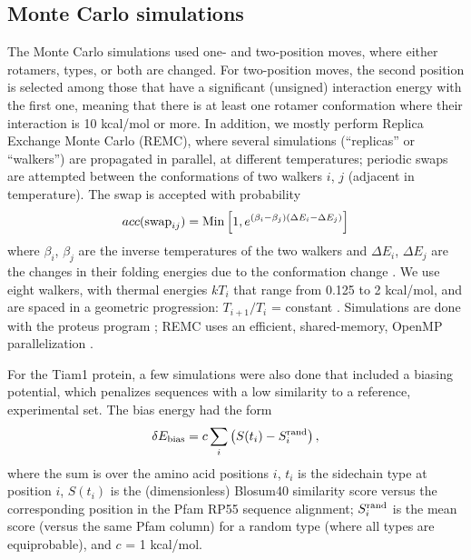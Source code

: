\documentclass[12pt]{article}
\begin{document}
\subsection{Monte Carlo simulations}
The Monte Carlo simulations used one- and two-position moves, where either rotamers, types, or both are changed. For two-position
moves, the second position is selected among those that have a significant (unsigned) interaction energy with the first one,
meaning that there is at least one rotamer conformation where their interaction is 10 kcal/mol or more. In addition, we mostly
perform Replica Exchange Monte Carlo (REMC), where several simulations (``replicas'' or ``walkers'') are propagated in parallel,
at different temperatures; periodic swaps are attempted between the conformations of two walkers $i$, $j$ (adjacent in temperature).
The swap is accepted with probability
\begin{equation} \label{eq:remc}
acc({\rm swap}_{ij}) = {\rm Min} \left[ 1, e^{(\beta_i - \beta_j)(\Delta E_i - \Delta E_j)} \right]
\end{equation}
where $\beta_i$, $\beta_j$ are the inverse temperatures of the two walkers and $\Delta E_i$, $\Delta E_j$ are the changes in
their folding energies due to the conformation change \cite{Kofke02,Earl05}. We use eight walkers, with thermal energies $kT_i$
that range from 0.125 to 2 kcal/mol, and are spaced in a geometric progression: $T_{i+1}/T_i$ = constant \cite{Kofke02}.
Simulations are done with the proteus program \cite{Simonson13b}; REMC uses an efficient, shared-memory, OpenMP parallelization
\cite{Mignon16}.

For the Tiam1 protein, a few simulations were also done that included a biasing potential, which penalizes sequences with
a low similarity to a reference, experimental set. The bias energy had the form
\begin{equation} \label{eq:bias}
\delta E_{\rm bias} = c \sum_i \left( S(t_i) - S_i^{\rm rand} \right),
\end{equation}
where the sum is over the amino acid positions $i$, $t_i$ is the sidechain type at position $i$, $S(t_i)$ is the (dimensionless)
Blosum40 similarity score versus the corresponding position in the Pfam RP55 sequence alignment; $S_i^{\rm rand}$ is the mean score
(versus the same Pfam column) for a random type (where all types are equiprobable), and $c$ = 1 kcal/mol.
\end{document}

